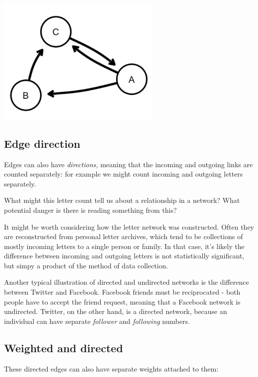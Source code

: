 \documentclass[
]{book}
\begin{document}
\includegraphics[width=3.125in,height=\textheight]{images/Screenshot 2022-09-26 at 11.42.58.png}

\hypertarget{edge-direction}{%
\subsection{Edge direction}\label{edge-direction}}

Edges can also have \emph{directions,} meaning that the incoming and outgoing links are counted separately: for example we might count incoming and outgoing letters separately.

What might this letter count tell us about a relationship in a network? What potential danger is there is reading something from this?

It might be worth considering how the letter network was constructed. Often they are reconstructed from personal letter archives, which tend to be collections of mostly incoming letters to a single person or family. In that case, it's likely the difference between incoming and outgoing letters is not statistically significant, but simpy a product of the method of data collection.

Another typical illustration of directed and undirected networks is the difference between Twitter and Facebook. Facebook friends must be reciprocated - both people have to accept the friend request, meaning that a Facebook network is undirected. Twitter, on the other hand, is a directed network, because an individual can have separate \emph{follower} and \emph{following} numbers.

\hypertarget{weighted-and-directed}{%
\subsection{Weighted and directed}\label{weighted-and-directed}}

These directed edges can also have separate weights attached to them:
\end{document}
